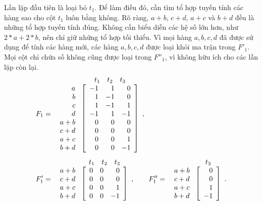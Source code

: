Lần lặp đầu tiên là loại bỏ $t_1$. Để làm điều đó, cần tìm tổ hợp tuyến tính các hàng sao cho cột $t_1$ luôn bằng không. Rõ ràng, $a+b$, $c+d$, $a+c$ và $b+d$ đều là những tổ hợp tuyến tính đúng. Không cần biểu diễn các hệ số lớn hơn, như $2*a+2*b$, nên chỉ giữ những tổ hợp tối thiểu. Vì mọi hàng $a,b,c,d$ đã được sử dụng để tính các hàng mới, các hàng $a,b,c,d$ được loại khỏi ma trận trong $F'_1$. Mọi cột chỉ chứa số không cũng được loại trong $F''_1$, vì không hữu ích cho các lần lặp còn lại.
\[
\begin{aligned}
F_1&=\begin{array}{r@{\ }c}
&\begin{array}{rrr}t_1&t_2&t_3\end{array}\\
\begin{array}{r}a\\b\\c\\d\\a+b\\c+d\\a+c\\b+d\end{array}&
\left[\begin{array}{rrr}-1&1&0\\1&-1&0\\1&-1&1\\-1&1&-1\\0&0&0\\0&0&0\\0&0&1\\0&0&-1\end{array}\right]
\end{array},\\[1ex]
F'_1&=\begin{array}{r@{\ }c}
&\begin{array}{rrr}t_1&t_2&t_3\end{array}\\
\begin{array}{r}a+b\\c+d\\a+c\\b+d\end{array}&
\left[\begin{array}{rrr}0&0&0\\0&0&0\\0&0&1\\0&0&-1\end{array}\right]
\end{array},\qquad
F''_1=\begin{array}{r@{\ }c}
&t_3\\
\begin{array}{r}a+b\\c+d\\a+c\\b+d\end{array}&
\left[\begin{array}{r}0\\0\\1\\-1\end{array}\right]
\end{array}.
\end{aligned}
\]

